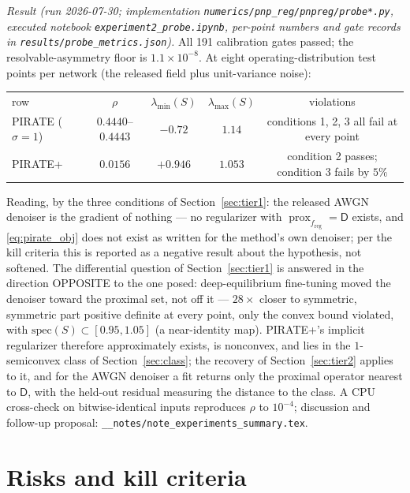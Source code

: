 \documentclass[11pt]{article}
\theoremstyle{definition}
\newcommand{\D}{\mathsf{D}}
\newcommand{\freg}{f_{\mathrm{reg}}}
\newcommand{\prox}{\operatorname{prox}}
\newcommand{\code}[1]{\texttt{#1}}
\begin{document}
\emph{Result (run 2026-07-30; implementation \code{numerics/pnp\_reg/pnpreg/probe*.py}, executed notebook \code{experiment2\_probe.ipynb}, per-point numbers and gate records in \code{results/probe\_metrics.json}).} All 191 calibration gates passed; the resolvable-asymmetry floor is $1.1 \times 10^{-8}$. At eight operating-distribution test points per network (the released field plus unit-variance noise):
\begin{center}
\small
\begin{tabular}{lcccc}
row & $\rho$ & $\lambda_{\min}(S)$ & $\lambda_{\max}(S)$ & violations \\
PIRATE ($\sigma = 1$) & $0.4440$--$0.4443$ & $-0.72$ & $1.14$ & conditions 1, 2, 3 all fail at every point \\
PIRATE+ & $0.0156$ & $+0.946$ & $1.053$ & condition 2 passes; condition 3 fails by $5\%$ \\
\end{tabular}
\end{center}
Reading, by the three conditions of Section~\ref{sec:tier1}: the released AWGN denoiser is the gradient of nothing --- no regularizer with $\prox_{\freg} = \D$ exists, and \eqref{eq:pirate_obj} does not exist as written for the method's own denoiser; per the kill criteria this is reported as a negative result about the hypothesis, not softened. The differential question of Section~\ref{sec:tier1} is answered in the direction OPPOSITE to the one posed: deep-equilibrium fine-tuning moved the denoiser toward the proximal set, not off it --- $28\times$ closer to symmetric, symmetric part positive definite at every point, only the convex bound violated, with $\mathrm{spec}(S) \subset [0.95, 1.05]$ (a near-identity map). PIRATE+'s implicit regularizer therefore approximately exists, is nonconvex, and lies in the $1$-semiconvex class of Section~\ref{sec:class}; the recovery of Section~\ref{sec:tier2} applies to it, and for the AWGN denoiser a fit returns only the proximal operator nearest to $\D$, with the held-out residual measuring the distance to the class. A CPU cross-check on bitwise-identical inputs reproduces $\rho$ to $10^{-4}$; discussion and follow-up proposal: \code{\_\_notes/note\_experiments\_summary.tex}.

\section{Risks and kill criteria}
\label{sec:risk}
\end{document}
